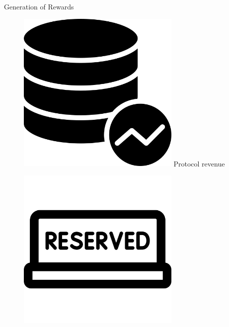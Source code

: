 \documentclass[handout]{beamer}
\begin{document}
\begin{frame}{Generation of Rewards}
\vspace{1em}


\begin{figure}[H]
  \begin{minipage}[t]{.25\textwidth}
  	\center 
    \includegraphics[width=0.7\textwidth]{../assets/images/database-usage.png}
    \vspace{0.8em}\vspace{0.8em}
    Protocol revenue
  \end{minipage}
  \hfill
  \begin{minipage}[t]{.25\textwidth}
  \center 
    \includegraphics[width=0.7\textwidth]{../assets/images/reserved.png}
	\vspace{0.8em}\vspace{0.8em}    

\end{minipage}
\end{figure}
\end{frame}
\end{document}
